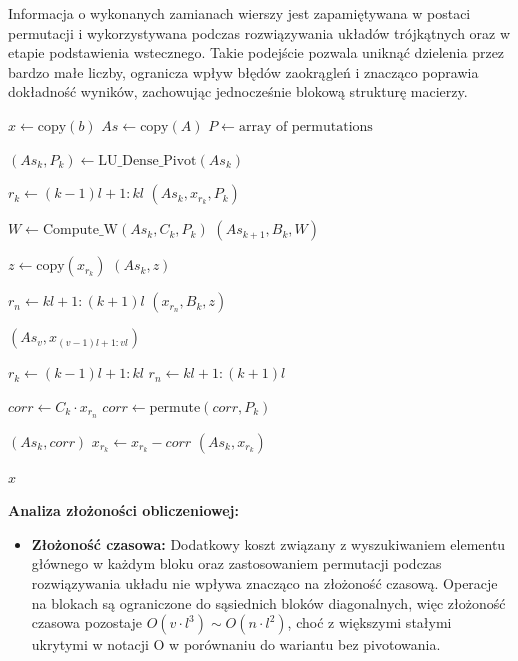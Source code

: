 \documentclass{article}
\begin{document}
Informacja o wykonanych zamianach wierszy jest zapamiętywana w postaci permutacji
i wykorzystywana podczas rozwiązywania układów trójkątnych oraz w etapie
podstawienia wstecznego. Takie podejście pozwala uniknąć dzielenia przez bardzo
małe liczby, ogranicza wpływ błędów zaokrągleń i znacząco poprawia dokładność
wyników, zachowując jednocześnie blokową strukturę macierzy.


\begin{algorithm}[H]
\caption{Eliminacja Gaussa dla macierzy blokowej z częściowym wyborem elementu głównego}
\begin{algorithmic}[1]
    \State $x \gets \text{copy}(b)$
    \State $As \gets \text{copy}(A)$
    \State $P \gets \text{array of permutations}$

    \State {}
        \State $(As_k, P_k) \gets \text{LU\_Dense\_Pivot}(As_k)$
        
        \State $r_k \gets (k-1)l+1 : kl$
        \State {}$(As_k, x_{r_k}, P_k)$
        
            \State $W \gets \text{Compute\_W}(As_k, C_k, P_k)$
            \State {}$(As_{k+1}, B_k, W)$
            
            \State $z \gets \text{copy}(x_{r_k})$
            \State {}$(As_k, z)$
            
            \State $r_n \gets kl+1 : (k+1)l$
            \State {}$(x_{r_n}, B_k, z)$
        \EndIf
    \EndFor

    \State {}
    \State {}$(As_v, x_{(v-1)l+1 : vl})$

        \State $r_k \gets (k-1)l+1 : kl$
        \State $r_n \gets kl+1 : (k+1)l$
        
        \State $corr \gets C_k \cdot x_{r_n}$
        \State $corr \gets \text{permute}(corr, P_k)$
        
        \State {}$(As_k, corr)$
        \State $x_{r_k} \gets x_{r_k} - corr$
        \State {}$(As_k, x_{r_k})$
    \EndFor

    \State \Return $x$
\EndProcedure
\end{algorithmic}
\end{algorithm}
\textbf{Analiza złożoności obliczeniowej:}
\begin{itemize}
    \item \textbf{Złożoność czasowa:} Dodatkowy koszt związany z wyszukiwaniem
    elementu głównego w każdym bloku oraz zastosowaniem permutacji podczas
    rozwiązywania układu nie wpływa znacząco na złożoność czasową. Operacje na blokach są ograniczone do sąsiednich
    bloków diagonalnych, więc złożoność czasowa pozostaje $O(v
    \cdot l^3) \sim O(n \cdot l^2)$, choć z większymi stałymi ukrytymi w notacji
    O w porównaniu do wariantu bez pivotowania.
\end{itemize}    
\end{document}
